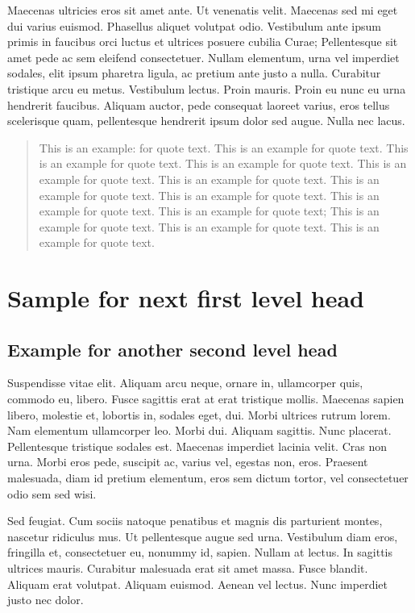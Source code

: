 \documentclass[CJCE,STIX2COL]{WileyNJD-v2}
\begin{document}
Maecenas ultricies eros sit amet ante. Ut venenatis velit. Maecenas sed mi eget dui varius euismod. Phasellus aliquet
volutpat odio. Vestibulum ante ipsum primis in faucibus orci luctus et ultrices posuere cubilia Curae; Pellentesque sit
amet pede ac sem eleifend consectetuer. Nullam elementum, urna vel imperdiet sodales, elit ipsum pharetra ligula,
ac pretium ante justo a nulla. Curabitur tristique arcu eu metus. Vestibulum lectus. Proin mauris. Proin eu nunc eu
urna hendrerit faucibus. Aliquam auctor, pede consequat laoreet varius, eros tellus scelerisque quam, pellentesque
hendrerit ipsum dolor sed augue. Nulla nec lacus.
\begin{quote}
This is an example\cite{Yoo2007,Boggs2002,Blanchard2015}: for quote text. This is an example for quote text. This is an example for quote text. This is an example for quote text\cite{Boggs2002}. This is an example for quote text. This is an example for quote text. This is an example for quote text. This is an example for quote text. This is an example for quote text. This is an example for quote text\cite{Yoo2007}; This is an example for quote text. This is an example for quote text. This is an example for quote text. 
\end{quote}

\section{Sample for next first level head}\label{sec3}

\subsection{Example for another second level head}

Suspendisse vitae elit. Aliquam arcu neque, ornare in, ullamcorper quis, commodo eu, libero. Fusce sagittis erat at
erat tristique mollis. Maecenas sapien libero, molestie et, lobortis in, sodales eget, dui. Morbi ultrices rutrum lorem.
Nam elementum ullamcorper leo. Morbi dui. Aliquam sagittis. Nunc placerat. Pellentesque tristique sodales est.
Maecenas imperdiet lacinia velit. Cras non urna. Morbi eros pede, suscipit ac, varius vel, egestas non, eros. Praesent
malesuada, diam id pretium elementum, eros sem dictum tortor, vel consectetuer odio sem sed wisi.

Sed feugiat. Cum sociis natoque penatibus et magnis dis parturient montes, nascetur ridiculus mus. Ut pellentesque
augue sed urna. Vestibulum diam eros, fringilla et, consectetuer eu, nonummy id, sapien. Nullam at lectus. In sagittis
ultrices mauris. Curabitur malesuada erat sit amet massa. Fusce blandit. Aliquam erat volutpat. Aliquam euismod.
Aenean vel lectus. Nunc imperdiet justo nec dolor.
\end{document}
